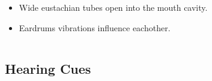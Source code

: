 \documentclass{beamer}
\begin{document}
\begin{frame}[t]
\begin{columns}
    \begin{column}{0.5\textwidth}
    \centering
    \small
     \begin{itemize}
         \item[] Wide eustachian tubes open into the mouth cavity.
     \item[] Eardrums vibrations influence eachother.
     \end{itemize}
    \end{column}
    
  \end{columns}
\end{frame}

\subsection{Hearing Cues}
\end{document}

